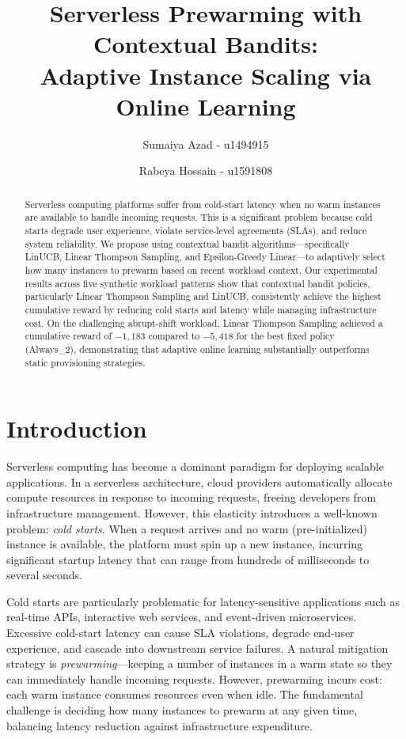\documentclass[11pt]{article}
\title{\textbf{Serverless Prewarming with Contextual Bandits: \\ Adaptive Instance Scaling via Online Learning}}
\author{
    Sumaiya Azad - u1494915 \and Rabeya Hossain - u1591808
}
\date{}
\begin{document}
\maketitle

\begin{abstract}
Serverless computing platforms suffer from cold-start latency when no warm instances are available to handle incoming requests. This is a significant problem because cold starts degrade user experience, violate service-level agreements (SLAs), and reduce system reliability. We propose using contextual bandit algorithms---specifically LinUCB, Linear Thompson Sampling, and Epsilon-Greedy Linear---to adaptively select how many instances to prewarm based on recent workload context. Our experimental results across five synthetic workload patterns show that contextual bandit policies, particularly Linear Thompson Sampling and LinUCB, consistently achieve the highest cumulative reward by reducing cold starts and latency while managing infrastructure cost. On the challenging abrupt-shift workload, Linear Thompson Sampling achieved a cumulative reward of $-1{,}183$ compared to $-5{,}418$ for the best fixed policy (Always\_2), demonstrating that adaptive online learning substantially outperforms static provisioning strategies.
\end{abstract}

\section{Introduction}

Serverless computing has become a dominant paradigm for deploying scalable applications. In a serverless architecture, cloud providers automatically allocate compute resources in response to incoming requests, freeing developers from infrastructure management. However, this elasticity introduces a well-known problem: \textit{cold starts}. When a request arrives and no warm (pre-initialized) instance is available, the platform must spin up a new instance, incurring significant startup latency that can range from hundreds of milliseconds to several seconds.

Cold starts are particularly problematic for latency-sensitive applications such as real-time APIs, interactive web services, and event-driven microservices. Excessive cold-start latency can cause SLA violations, degrade end-user experience, and cascade into downstream service failures. A natural mitigation strategy is \textit{prewarming}---keeping a number of instances in a warm state so they can immediately handle incoming requests. However, prewarming incurs cost: each warm instance consumes resources even when idle. The fundamental challenge is deciding how many instances to prewarm at any given time, balancing latency reduction against infrastructure expenditure.
\end{document}
